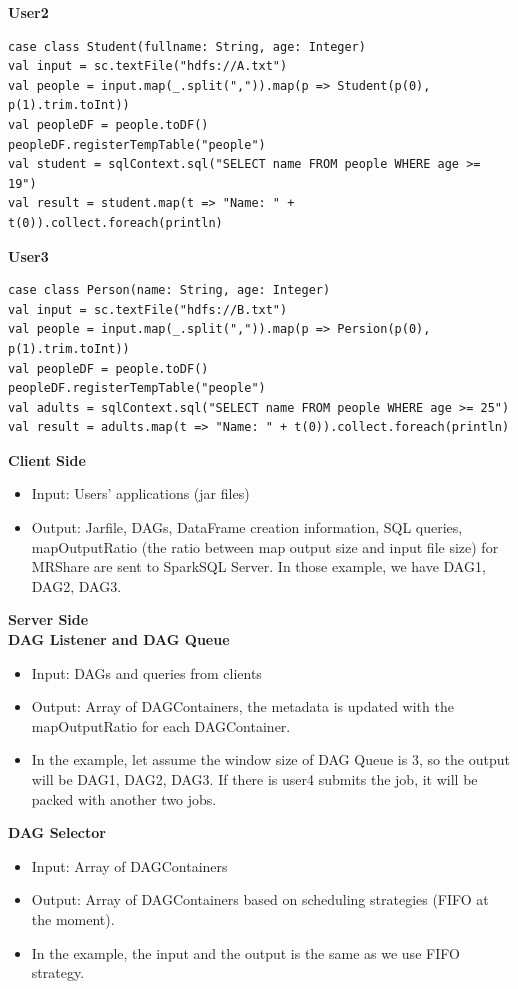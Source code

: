 \textbf{User2}

\begin{lstlisting}
case class Student(fullname: String, age: Integer)
val input = sc.textFile("hdfs://A.txt")
val people = input.map(_.split(",")).map(p => Student(p(0), p(1).trim.toInt))
val peopleDF = people.toDF()
peopleDF.registerTempTable("people")
val student = sqlContext.sql("SELECT name FROM people WHERE age >= 19")
val result = student.map(t => "Name: " + t(0)).collect.foreach(println)
\end{lstlisting}

\textbf{User3}

\begin{lstlisting}
case class Person(name: String, age: Integer)
val input = sc.textFile("hdfs://B.txt")
val people = input.map(_.split(",")).map(p => Persion(p(0), p(1).trim.toInt))
val peopleDF = people.toDF()
peopleDF.registerTempTable("people")
val adults = sqlContext.sql("SELECT name FROM people WHERE age >= 25")
val result = adults.map(t => "Name: " + t(0)).collect.foreach(println)
\end{lstlisting}

\textbf{Client Side}
\begin{itemize}
\item Input: Users’ applications (jar files)
\item Output: Jarfile, DAGs, DataFrame creation information, SQL queries, mapOutputRatio (the ratio between map output size and input file size) for MRShare are sent to SparkSQL Server. In those example, we have DAG1, DAG2, DAG3.
\end{itemize}

\textbf{Server Side}\\
\textbf{DAG Listener and DAG Queue}
\begin{itemize}
\item Input: DAGs and queries from clients
\item Output: Array of DAGContainers, the metadata is updated with the mapOutputRatio for each DAGContainer.
\item In the example, let assume the window size of DAG Queue is 3, so the output will be DAG1, DAG2, DAG3. If there is user4 submits the job, it will be packed with another two jobs.
\end{itemize}

\textbf{DAG Selector}
\begin{itemize}
\item Input: Array of DAGContainers
\item Output: Array of DAGContainers based on scheduling strategies (FIFO at the moment).
\item In the example, the input and the output is the same as we use FIFO strategy.
\end{itemize}

